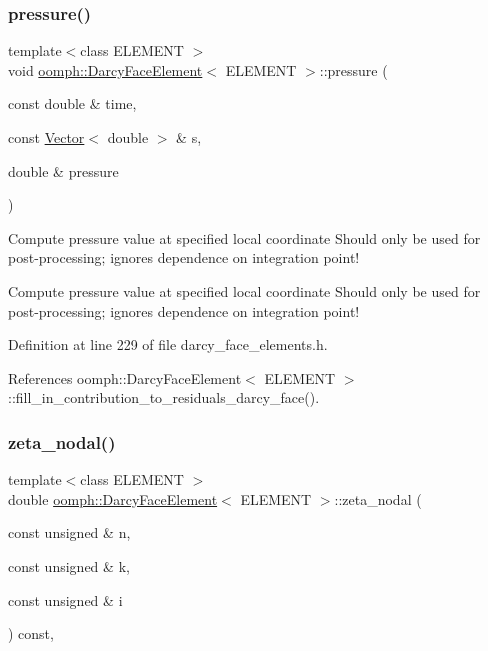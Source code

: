 \subsubsection{\texorpdfstring{pressure()}{pressure()}}
{\footnotesize\ttfamily template$<$class E\+L\+E\+M\+E\+NT $>$ \\
void \hyperlink{classoomph_1_1DarcyFaceElement}{oomph\+::\+Darcy\+Face\+Element}$<$ E\+L\+E\+M\+E\+NT $>$\+::pressure (\begin{DoxyParamCaption}\item[{const double \&}]{time,  }\item[{const \hyperlink{classoomph_1_1Vector}{Vector}$<$ double $>$ \&}]{s,  }\item[{double \&}]{pressure }\end{DoxyParamCaption})}



Compute pressure value at specified local coordinate Should only be used for post-\/processing; ignores dependence on integration point! 

Compute pressure value at specified local coordinate Should only be used for post-\/processing; ignores dependence on integration point! 

Definition at line 229 of file darcy\+\_\+face\+\_\+elements.\+h.



References oomph\+::\+Darcy\+Face\+Element$<$ E\+L\+E\+M\+E\+N\+T $>$\+::fill\+\_\+in\+\_\+contribution\+\_\+to\+\_\+residuals\+\_\+darcy\+\_\+face().

\mbox{\label{classoomph_1_1DarcyFaceElement_aeee8ea8c6a62b345269c6339ffe8eed4}} 
\subsubsection{\texorpdfstring{zeta\+\_\+nodal()}{zeta\_nodal()}}
{\footnotesize\ttfamily template$<$class E\+L\+E\+M\+E\+NT $>$ \\
double \hyperlink{classoomph_1_1DarcyFaceElement}{oomph\+::\+Darcy\+Face\+Element}$<$ E\+L\+E\+M\+E\+NT $>$\+::zeta\+\_\+nodal (\begin{DoxyParamCaption}\item[{const unsigned \&}]{n,  }\item[{const unsigned \&}]{k,  }\item[{const unsigned \&}]{i }\end{DoxyParamCaption}) const\hspace{0.3cm}{\ttfamily [inline]}, {\ttfamily [virtual]}}




